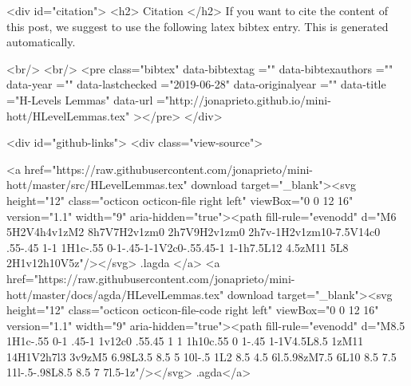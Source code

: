   
  <div id="citation">
  <h2> Citation </h2>
  If you want to cite the content of this post,
  we suggest to use the following latex bibtex entry.
  This is generated automatically.

  <br/>
  <br/>
  <pre class="bibtex"
       data-bibtextag =""
       data-bibtexauthors =""
       data-year =""
       data-lastchecked ="2019-06-28"
       data-originalyear =""
       data-title ="H-Levels Lemmas"
       data-url ="http://jonaprieto.github.io/mini-hott/HLevelLemmas.tex"
  ></pre>
  </div>
  

  <div id="github-links">
    <div class="view-source">
      
        <a href="https://raw.githubusercontent.com/jonaprieto/mini-hott/master/src/HLevelLemmas.tex" download target="_blank"><svg height="12" class="octicon octicon-file right left" viewBox="0 0 12 16" version="1.1" width="9" aria-hidden="true"><path fill-rule="evenodd" d="M6 5H2V4h4v1zM2 8h7V7H2v1zm0 2h7V9H2v1zm0 2h7v-1H2v1zm10-7.5V14c0 .55-.45 1-1 1H1c-.55 0-1-.45-1-1V2c0-.55.45-1 1-1h7.5L12 4.5zM11 5L8 2H1v12h10V5z"/></svg> .lagda </a>
        <a href="https://raw.githubusercontent.com/jonaprieto/mini-hott/master/docs/agda/HLevelLemmas.tex" download target="_blank"><svg height="12" class="octicon octicon-file-code right left" viewBox="0 0 12 16" version="1.1" width="9" aria-hidden="true"><path fill-rule="evenodd" d="M8.5 1H1c-.55 0-1 .45-1 1v12c0 .55.45 1 1 1h10c.55 0 1-.45 1-1V4.5L8.5 1zM11 14H1V2h7l3 3v9zM5 6.98L3.5 8.5 5 10l-.5 1L2 8.5 4.5 6l.5.98zM7.5 6L10 8.5 7.5 11l-.5-.98L8.5 8.5 7 7l.5-1z"/></svg> .agda</a>
      

